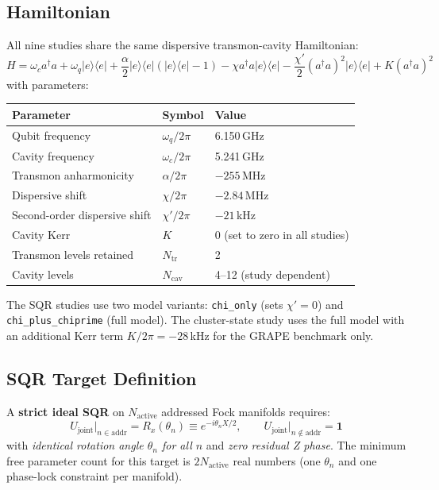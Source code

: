 \documentclass[11pt,letterpaper]{article}
\newcommand{\nact}{N_{\text{active}}}
\begin{document}
\subsection{Hamiltonian}

All nine studies share the same dispersive transmon-cavity Hamiltonian:
\begin{equation}
  H = \omega_c a^\dagger a + \omega_q \vert e\rangle\langle e\vert
      + \frac{\alpha}{2}\vert e\rangle\langle e\vert(\vert e\rangle\langle e\vert - 1)
      - \chi a^\dagger a \vert e\rangle\langle e\vert
      - \frac{\chi'}{2} (a^\dagger a)^2 \vert e\rangle\langle e\vert
      + K (a^\dagger a)^2
\end{equation}
with parameters:
\begin{center}
\begin{tabular}{lll}
\toprule
Parameter & Symbol & Value \\
\midrule
Qubit frequency & $\omega_q / 2\pi$ & 6.150\,GHz \\
Cavity frequency & $\omega_c / 2\pi$ & 5.241\,GHz \\
Transmon anharmonicity & $\alpha / 2\pi$ & $-255$\,MHz \\
Dispersive shift & $\chi / 2\pi$ & $-2.84$\,MHz \\
Second-order dispersive shift & $\chi' / 2\pi$ & $-21$\,kHz \\
Cavity Kerr & $K$ & 0 (set to zero in all studies) \\
Transmon levels retained & $N_\text{tr}$ & 2 \\
Cavity levels & $N_\text{cav}$ & 4--12 (study dependent) \\
\bottomrule
\end{tabular}
\end{center}

\noindent The SQR studies use two model variants:
\texttt{chi\_only} (sets $\chi' = 0$) and \texttt{chi\_plus\_chiprime} (full model).
The cluster-state study uses the full model with an additional Kerr term $K/2\pi = -28$\,kHz
for the GRAPE benchmark only.

\subsection{SQR Target Definition}

A \textbf{strict ideal SQR} on $\nact$ addressed Fock manifolds requires:
\begin{equation}
  U_\text{joint}\big\vert_{n \in \text{addr}} = R_x(\theta_n)
  \equiv e^{-i\theta_n X / 2},
  \qquad
  U_\text{joint}\big\vert_{n \notin \text{addr}} = \mathbf{1}
\end{equation}
with \emph{identical rotation angle $\theta_n$ for all $n$} and \emph{zero residual Z phase}.
The minimum free parameter count for this target is $2\nact$ real numbers
(one $\theta_n$ and one phase-lock constraint per manifold).
\end{document}
